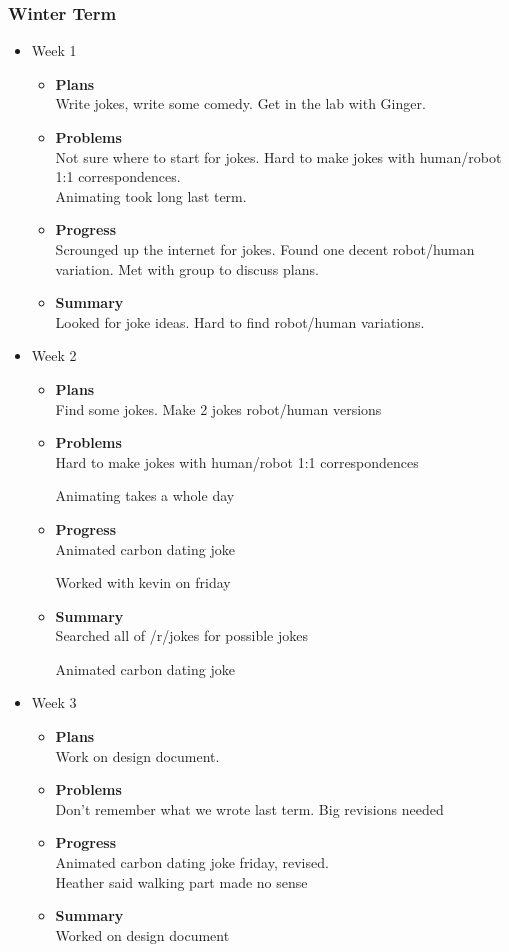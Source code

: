 	\subsubsection{Winter Term}
	\begin{itemize}
		\item{Week 1}
		\begin{itemize}
			\item \textbf{Plans} \\
			Write jokes, write some comedy. Get in the lab with Ginger.
			\item \textbf{Problems} \\
			Not sure where to start for jokes. Hard to make jokes with human/robot 1:1 correspondences. \\
			Animating took long last term.
			\item \textbf{Progress} \\
			Scrounged up the internet for jokes. Found one decent robot/human variation. Met with group to discuss plans.
			\item \textbf{Summary} \\
			Looked for joke ideas. Hard to find robot/human variations.
		\end{itemize}
		\item{Week 2}
		\begin{itemize}
			\item \textbf{Plans} \\
			Find some jokes. Make 2 jokes robot/human versions
			\item \textbf{Problems} \\
			Hard to make jokes with human/robot 1:1 correspondences

Animating takes a whole day

			\item \textbf{Progress} \\
			Animated carbon dating joke

Worked with kevin on friday
			\item \textbf{Summary} \\
			Searched all of /r/jokes for possible jokes

Animated carbon dating joke
		\end{itemize}
		\item{Week 3}
		\begin{itemize}
			\item \textbf{Plans} \\
			Work on design document.
			\item \textbf{Problems} \\
			Don't remember what we wrote last term. Big revisions needed
			\item \textbf{Progress} \\
			Animated carbon dating joke friday, revised. \\
Heather said walking part made no sense
			\item \textbf{Summary} \\
			Worked on design document


\end{itemize}
\end{itemize}
